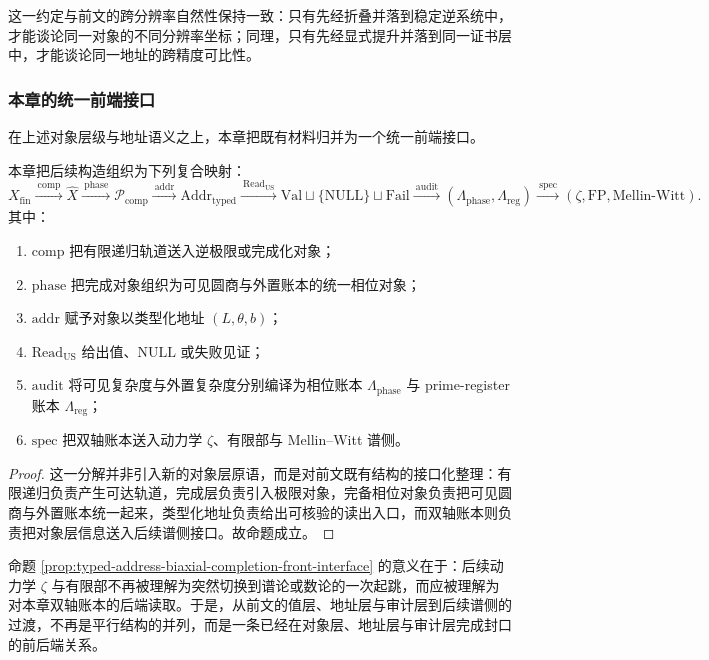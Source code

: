 这一约定与前文的跨分辨率自然性保持一致：只有先经折叠并落到稳定逆系统中，才能谈论同一对象的不同分辨率坐标；同理，只有先经显式提升并落到同一证书层中，才能谈论同一地址的跨精度可比性。

\subsubsection{本章的统一前端接口}\label{subsubsec:typed-address-biaxial-completion-front-interface}
在上述对象层级与地址语义之上，本章把既有材料归并为一个统一前端接口。

\begin{proposition}[本章前端接口分解]\label{prop:typed-address-biaxial-completion-front-interface}
本章把后续构造组织为下列复合映射：
\[
X_{\mathrm{fin}}
\xrightarrow{\ \mathrm{comp}\ }
\widehat X
\xrightarrow{\ \mathrm{phase}\ }
\mathcal P_{\mathrm{comp}}
\xrightarrow{\ \mathrm{addr}\ }
\mathrm{Addr}_{\mathrm{typed}}
\xrightarrow{\ \mathrm{Read}_{\mathrm{US}}\ }
\mathrm{Val}\sqcup\{\mathrm{NULL}\}\sqcup\mathrm{Fail}
\xrightarrow{\ \mathrm{audit}\ }
(\Lambda_{\mathrm{phase}},\Lambda_{\mathrm{reg}})
\xrightarrow{\ \mathrm{spec}\ }
(\zeta,\mathrm{FP},\mathrm{Mellin\text{-}Witt}).
\]
其中：
\begin{enumerate}
  \item \(\mathrm{comp}\) 把有限递归轨道送入逆极限或完成化对象；
  \item \(\mathrm{phase}\) 把完成对象组织为可见圆商与外置账本的统一相位对象；
  \item \(\mathrm{addr}\) 赋予对象以类型化地址 \((L,\theta,b)\)；
  \item \(\mathrm{Read}_{\mathrm{US}}\) 给出值、\(\mathrm{NULL}\) 或失败见证；
  \item \(\mathrm{audit}\) 将可见复杂度与外置复杂度分别编译为相位账本 \(\Lambda_{\mathrm{phase}}\) 与 prime-register 账本 \(\Lambda_{\mathrm{reg}}\)；
  \item \(\mathrm{spec}\) 把双轴账本送入动力学 \(\zeta\)、有限部与 Mellin--Witt 谱侧。
\end{enumerate}
\end{proposition}

\begin{proof}
这一分解并非引入新的对象层原语，而是对前文既有结构的接口化整理：有限递归负责产生可达轨道，完成层负责引入极限对象，完备相位对象负责把可见圆商与外置账本统一起来，类型化地址负责给出可核验的读出入口，而双轴账本则负责把对象层信息送入后续谱侧接口。故命题成立。
\end{proof}

命题 \ref{prop:typed-address-biaxial-completion-front-interface} 的意义在于：后续动力学 \(\zeta\) 与有限部不再被理解为突然切换到谱论或数论的一次起跳，而应被理解为对本章双轴账本的后端读取。于是，从前文的值层、地址层与审计层到后续谱侧的过渡，不再是平行结构的并列，而是一条已经在对象层、地址层与审计层完成封口的前后端关系。
